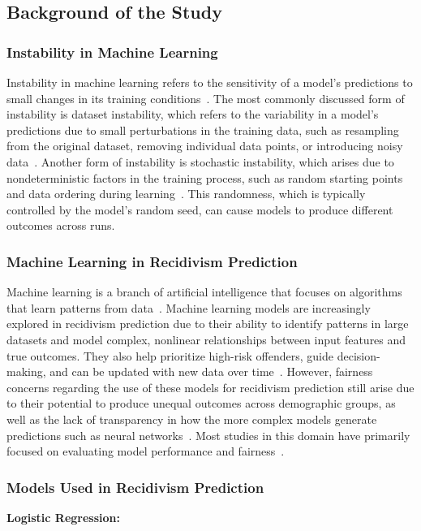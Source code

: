 \documentclass[12pt]{article}
\begin{document}
\newpage
\subsection{Background of the Study}
\subsubsection*{Instability in Machine Learning} 
\tab%
Instability in machine learning refers to the sensitivity of a model's predictions to small changes in its training conditions~\cite{sun2015stability}. The most commonly discussed form of instability is dataset instability, which refers to the variability in a model's predictions due to small perturbations in the training data, such as resampling from the original dataset, removing individual data points, or introducing noisy data~\cite{riley2023stability,hardt2016train}. Another form of instability is stochastic instability, which arises due to nondeterministic factors in the training process, such as random starting points and data ordering during learning~\cite{lopez2022instability}. This randomness, which is typically controlled by the model's random seed, can cause models to produce different outcomes across runs.

\subsubsection*{Machine Learning in Recidivism Prediction} 
\tab%
Machine learning is a branch of artificial intelligence that focuses on algorithms that learn patterns from data~\cite{duwe2017out}. Machine learning models are increasingly explored in recidivism prediction due to their ability to identify patterns in large datasets and model complex, nonlinear relationships between input features and true outcomes. They also help prioritize high-risk offenders, guide decision-making, and can be updated with new data over time~\cite{ozkan2017predicting, karimi2021enhancing}. However, fairness concerns regarding the use of these models for recidivism prediction still arise due to their potential to produce unequal outcomes across demographic groups, as well as the lack of transparency in how the more complex models generate predictions such as neural networks~\cite{dressel2018accuracy, tolan2019machine}. Most studies in this domain have primarily focused on evaluating model performance and fairness~\cite{travaini2022machine, tolan2019machine}.

\subsubsection*{Models Used in Recidivism Prediction} 
\tab%
\textbf{Logistic Regression:} 
\end{document}
